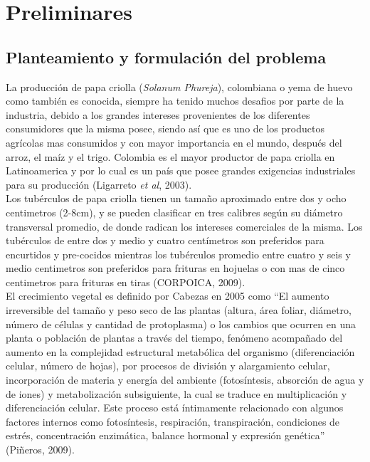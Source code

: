 \chapter{Preliminares}

\section{Planteamiento y formulaci\'on del problema}

La producción de papa criolla (\textit{Solanum Phureja}), colombiana o yema de huevo como tambi\'en es conocida, siempre ha tenido muchos desafios por parte de la industria, debido a los grandes intereses provenientes de los diferentes consumidores que la misma posee, siendo así que es uno de los productos agr\'icolas mas consumidos y con mayor importancia en el mundo, despu\'es del arroz, el ma\'iz y el trigo. Colombia es el mayor productor de papa criolla en Latinoamerica y por lo cual es un pa\'is que posee grandes exigencias industriales para su producci\'on (Ligarreto \textit{et al}, 2003).\\

Los tub\'erculos de papa criolla tienen un tama\~no aproximado entre dos y ocho centimetros (2-8cm), y se pueden clasificar en tres calibres según su diámetro transversal promedio,  de donde radican los intereses comerciales de la misma. Los tub\'erculos de entre dos y medio y cuatro cent\'imetros son preferidos para encurtidos y pre-cocidos mientras los tub\'erculos promedio entre cuatro y seis y medio centimetros son preferidos para frituras en hojuelas o con mas de cinco centimetros para frituras en tiras (CORPOICA, 2009).\\

El crecimiento vegetal es definido por Cabezas en 2005 como "`El aumento irreversible del tama\~no y peso seco de las plantas (altura, área foliar, diámetro, número de células y cantidad de protoplasma) o los cambios que ocurren en una planta o población de plantas a través del tiempo, fenómeno acompañado del aumento en la complejidad estructural metabólica del organismo (diferenciación celular, número de hojas), por procesos de división y alargamiento celular, incorporación de materia y energía del ambiente (fotosíntesis, absorción de agua y de iones) y metabolización subsiguiente, la cual se traduce en multiplicación y diferenciación celular. Este proceso está íntimamente relacionado con algunos factores internos como fotosíntesis, respiración, transpiración, condiciones de estrés, concentración enzimática, balance hormonal y expresión genética"' (Pi\~neros, 2009).\\

